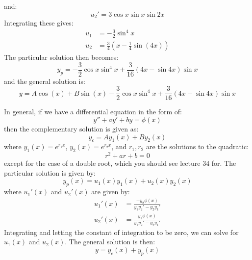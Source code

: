 \begin{itemize}
\begin{example}
        and:
        \begin{equation}
            u_2' = 3\cos x\sin x\sin 2x
            \label{eq:}
        \end{equation}
        Integrating these gives:
        \begin{align}
            u_1 &= -\frac{3}{2}\sin^4{x} \\
            u_2 &=  \frac{3}{4}\left(x-\frac{1}{4}\sin(4x)\right)
        \end{align}
        The particular solution then becomes:
        \begin{equation}
            y_p = -\frac{3}{2}\cos x\sin^4{x} + \frac{3}{16}(4x-\sin 4x)\sin x
            \label{eq:}
        \end{equation}
        and the general solution is:
        \begin{equation}
            y = A\cos(x)+B\sin(x) -\frac{3}{2}\cos x\sin^4{x} + \frac{3}{16}(4x-\sin 4x)\sin x
            \label{eq:}
        \end{equation}
    \end{example}
    \begin{theorem}
        In general, if we have a differential equation in the form of:
        \begin{equation}
            y''+ay'+by = \phi(x)
            \label{eq:}
        \end{equation}
        then the complementary solution is given as:
        \begin{equation}
            y_c = Ay_1(x)+By_2(x)
            \label{eq:}
        \end{equation}
        where $y_1(x)=e^{r_1x}$, $y_2(x)=e^{r_2x}$, and $r_1, r_2$ are the solutions to the quadratic:
        \begin{equation}
            r^2+ar+b=0
            \label{eq:}
        \end{equation}
        except for the case of a double root, which you should see lecture 34 for. The particular solution is given by:
        \begin{equation}
            y_p(x) = u_1(x)y_1(x)+u_2(x)y_2(x)
            \label{eq:}
        \end{equation}
        where $u_1'(x)$ and $u_2'(x)$ are given by:
        \begin{align}
            u_1'(x) &= \frac{-y_2\phi(x)}{y_1y_2'-y_2y_1'} \\ 
            u_2'(x) &= \frac{y_1\phi(x)}{y_1y_2'-y_2y_1'}
        \end{align}
        Integrating and letting the constant of integration to be zero, we can solve for $u_1(x)$ and $u_2(x)$. The general solution is then:
        \begin{equation}
            y = y_c(x) + y_p(x)
            \label{eq:}
        \end{equation}
        
    \end{theorem}
\end{itemize}